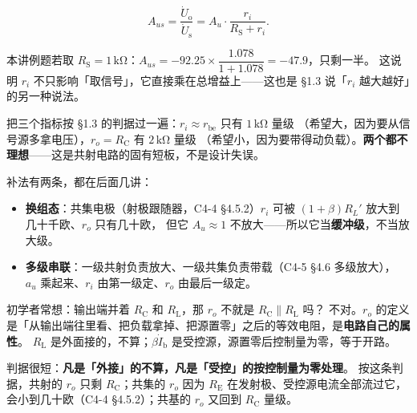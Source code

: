 \documentclass[11pt]{ctexart}
\begin{document}
\[ A_{us}=\frac{\dot{U}_{\mathrm{o}}}{\dot{U}_{\mathrm{s}}}=A_u\cdot\frac{r_i}{R_{\mathrm{S}}+r_i} . \]

本讲例题若取 $R_{\mathrm{S}}=1\,\mathrm{k\Omega}$：$A_{us}=-92.25\times\dfrac{1.078}{1+1.078}=-47.9$，只剩一半。
这说明 $r_i$ 不只影响「取信号」，它直接乘在总增益上——这也是 §1.3 说「$r_i$ 越大越好」的另一种说法。



把三个指标按 §1.3 的判据过一遍：$r_i\approx r_{\mathrm{be}}$ 只有 $1\,\mathrm{k\Omega}$ 量级
（希望大，因为要从信号源多拿电压），$r_o=R_{\mathrm{C}}$ 有 $2\,\mathrm{k\Omega}$ 量级
（希望小，因为要带得动负载）。\textbf{两个都不理想}——这是共射电路的固有短板，不是设计失误。

补法有两条，都在后面几讲：

\begin{itemize}
\item \textbf{换组态}：共集电极（射极跟随器，C4-4 §4.5.2）$r_i$ 可被 $(1+\beta)R_L'$ 放大到几十千欧、$r_o$ 只有几十欧，
但它 $A_u\approx1$ 不放大——所以它当\textbf{缓冲级}，不当放大级。
\item \textbf{多级串联}：一级共射负责放大、一级共集负责带载（C4-5 §4.6 多级放大），
$a_u$ 乘起来、$r_i$ 由第一级定、$r_o$ 由最后一级定。
\end{itemize}




初学者常想：输出端并着 $R_{\mathrm{C}}$ 和 $R_{\mathrm{L}}$，那 $r_o$ 不就是 $R_{\mathrm{C}}\parallel R_{\mathrm{L}}$ 吗？
不对。$r_o$ 的定义是「从输出端往里看、把负载拿掉、把源置零」之后的等效电阻，是\textbf{电路自己的属性}。
$R_{\mathrm{L}}$ 是外面接的，不算；$\beta\dot{I}_{\mathrm{b}}$ 是受控源，源置零后控制量为零，等于开路。

判据很短：\textbf{凡是「外接」的不算，凡是「受控」的按控制量为零处理}。
按这条判据，共射的 $r_o$ 只剩 $R_{\mathrm{C}}$；共集的 $r_o$ 因为 $R_{\mathrm{E}}$ 在发射极、受控源电流全部流过它，
会小到几十欧（C4-4 §4.5.2）；共基的 $r_o$ 又回到 $R_{\mathrm{C}}$ 量级。


\end{document}
